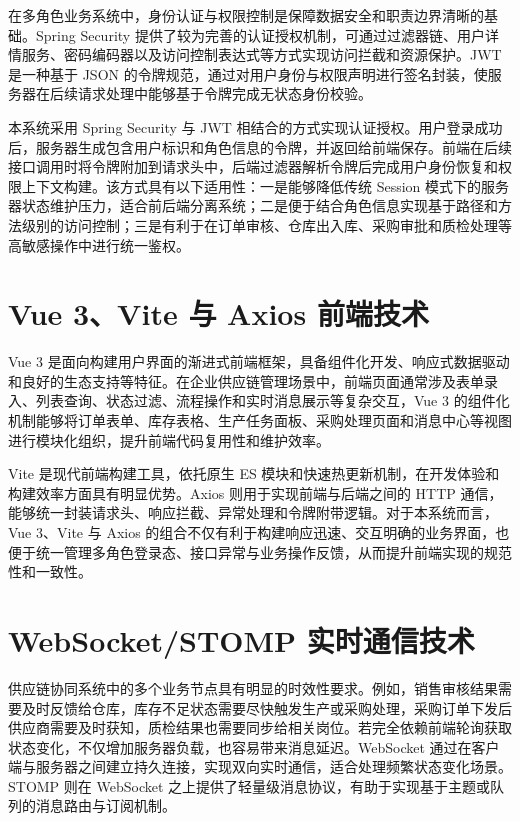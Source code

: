 在多角色业务系统中，身份认证与权限控制是保障数据安全和职责边界清晰的基础。Spring Security 提供了较为完善的认证授权机制，可通过过滤器链、用户详情服务、密码编码器以及访问控制表达式等方式实现访问拦截和资源保护\citep{springsecuritydocs}。JWT 是一种基于 JSON 的令牌规范，通过对用户身份与权限声明进行签名封装，使服务器在后续请求处理中能够基于令牌完成无状态身份校验\citep{rfc7519}。

本系统采用 Spring Security 与 JWT 相结合的方式实现认证授权。用户登录成功后，服务器生成包含用户标识和角色信息的令牌，并返回给前端保存。前端在后续接口调用时将令牌附加到请求头中，后端过滤器解析令牌后完成用户身份恢复和权限上下文构建。该方式具有以下适用性：一是能够降低传统 Session 模式下的服务器状态维护压力，适合前后端分离系统；二是便于结合角色信息实现基于路径和方法级别的访问控制；三是有利于在订单审核、仓库出入库、采购审批和质检处理等高敏感操作中进行统一鉴权。

\section{Vue 3、Vite 与 Axios 前端技术}

Vue 3 是面向构建用户界面的渐进式前端框架，具备组件化开发、响应式数据驱动和良好的生态支持等特征\citep{vuedocs}。在企业供应链管理场景中，前端页面通常涉及表单录入、列表查询、状态过滤、流程操作和实时消息展示等复杂交互，Vue 3 的组件化机制能够将订单表单、库存表格、生产任务面板、采购处理页面和消息中心等视图进行模块化组织，提升前端代码复用性和维护效率。

Vite 是现代前端构建工具，依托原生 ES 模块和快速热更新机制，在开发体验和构建效率方面具有明显优势\citep{vitedocs}。Axios 则用于实现前端与后端之间的 HTTP 通信，能够统一封装请求头、响应拦截、异常处理和令牌附带逻辑。对于本系统而言，Vue 3、Vite 与 Axios 的组合不仅有利于构建响应迅速、交互明确的业务界面，也便于统一管理多角色登录态、接口异常与业务操作反馈，从而提升前端实现的规范性和一致性。

\section{WebSocket/STOMP 实时通信技术}

供应链协同系统中的多个业务节点具有明显的时效性要求。例如，销售审核结果需要及时反馈给仓库，库存不足状态需要尽快触发生产或采购处理，采购订单下发后供应商需要及时获知，质检结果也需要同步给相关岗位。若完全依赖前端轮询获取状态变化，不仅增加服务器负载，也容易带来消息延迟。WebSocket 通过在客户端与服务器之间建立持久连接，实现双向实时通信，适合处理频繁状态变化场景\citep{rfc6455}。STOMP 则在 WebSocket 之上提供了轻量级消息协议，有助于实现基于主题或队列的消息路由与订阅机制\citep{stomp12}。

